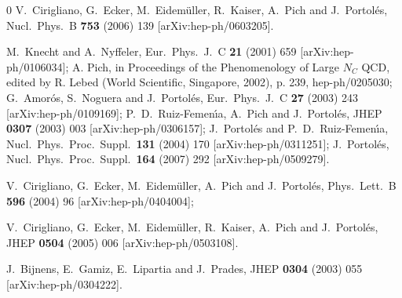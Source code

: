 \documentclass{appolb}
\begin{document}
{\begin{thebibliography}{0}
  V.~Cirigliano, G.~Ecker, M.~Eidem\"uller, R.~Kaiser, A.~Pich and J.~Portol\'es,
  Nucl.\ Phys.\  B {\bf 753} (2006) 139
  [arXiv:hep-ph/0603205].

  M.~Knecht and A.~Nyffeler,
  Eur.\ Phys.\ J.\  C {\bf 21} (2001) 659
  [arXiv:hep-ph/0106034];
  A. Pich, in Proceedings of the Phenomenology of Large $N_C$ QCD, 
  edited by R. Lebed (World Scientific, Singapore, 2002), p. 239, hep-ph/0205030;
  G.~Amor\'os, S.~Noguera and J.~Portol\'es,
  Eur.\ Phys.\ J.\  C {\bf 27} (2003) 243
  [arXiv:hep-ph/0109169];
  P.~D.~Ruiz-Femen\'{\i}a, A.~Pich and J.~Portol\'es,
  JHEP {\bf 0307} (2003) 003
  [arXiv:hep-ph/0306157];
  J.~Portol\'es and P.~D.~Ruiz-Femen\'{\i}a,
  Nucl.\ Phys.\ Proc.\ Suppl.\  {\bf 131} (2004) 170
  [arXiv:hep-ph/0311251];
  J.~Portol\'es,
  Nucl.\ Phys.\ Proc.\ Suppl.\  {\bf 164} (2007) 292
  [arXiv:hep-ph/0509279].

  V.~Cirigliano, G.~Ecker, M.~Eidem\"uller, A.~Pich and J.~Portol\'es,
  Phys.\ Lett.\  B {\bf 596} (2004) 96
  [arXiv:hep-ph/0404004];

  V.~Cirigliano, G.~Ecker, M.~Eidem\"uller, R.~Kaiser, A.~Pich and J.~Portol\'es,
  JHEP {\bf 0504} (2005) 006
  [arXiv:hep-ph/0503108].

  J.~Bijnens, E.~Gamiz, E.~Lipartia and J.~Prades,
  JHEP {\bf 0304} (2003) 055
  [arXiv:hep-ph/0304222].


\end{thebibliography}}
\end{document}
